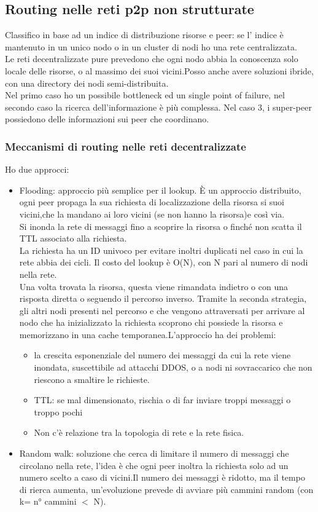 \documentclass[16px]{article}
\begin{document}
\subsection{Routing nelle reti p2p non strutturate}
Classifico in base ad un indice di distribuzione risorse e peer: se l' indice è mantenuto in un unico nodo o in un cluster di nodi ho una rete centralizzata.\\ Le reti decentralizzate pure prevedono che ogni nodo abbia la conoscenza solo locale delle risorse, o al massimo dei suoi vicini.Posso anche avere soluzioni ibride, con una directory dei nodi semi-distribuita.\\Nel primo caso ho un possibile bottleneck ed un single point of failure, nel secondo caso la ricerca dell'informazione è più complessa. Nel caso 3, i super-peer possiedono delle informazioni sui peer che coordinano.
\subsubsection{Meccanismi di routing nelle reti decentralizzate}
Ho due approcci:
\begin{itemize}
\item Flooding: approccio più semplice per il lookup. È un approccio distribuito, ogni peer propaga la sua richiesta di localizzazione della risorsa si suoi vicini,che la mandano ai loro vicini (se non hanno la risorsa)e così via.\\ Si inonda la rete di messaggi fino a scoprire la risorsa o finché non scatta il TTL associato alla richiesta.\\ La richiesta ha un ID univoco per evitare inoltri duplicati nel caso in cui la rete abbia dei cicli. Il costo del lookup è O(N), con N pari al numero di nodi nella rete.\\ Una volta trovata la risorsa, questa viene rimandata indietro o con una risposta diretta o seguendo il percorso inverso. Tramite la seconda strategia, gli altri nodi presenti nel percorso e che vengono attraversati per arrivare al nodo che ha inizializzato la richiesta scoprono chi possiede la risorsa e memorizzano in una cache temporanea.L'approccio ha dei problemi:
\begin{itemize}
\item la crescita esponenziale del numero dei messaggi da cui la rete viene inondata, suscettibile ad attacchi DDOS, o a nodi ni sovraccarico che non riescono a smaltire le richieste.
\item TTL: se mal dimensionato, rischia o di far inviare troppi messaggi o troppo pochi
\item Non c'è relazione tra la topologia di rete e la rete fisica.
\end{itemize}
\item Random walk: soluzione che cerca di limitare il numero di messaggi che circolano nella rete, l'idea è che ogni peer inoltra la richiesta solo ad un numero scelto a caso di vicini.Il numero dei messaggi è ridotto, ma il tempo di rierca aumenta, un'evoluzione prevede di avviare più cammini random (con k= n° cammini $<$ N).
\end{itemize}
\end{document}
